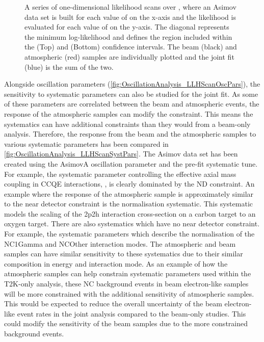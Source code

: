 \begin{figure}[h]
\begin{subfigure}[t]{1.0\textwidth}
  \end{subfigure}
  \caption{A series of one-dimensional likelihood scans over , where an Asimov data set is built for each value of  on the x-axis and the likelihood is evaluated for each value of  on the y-axis. The diagonal represents the minimum log-likelihood and defines the region included within the \quickmath{1\sigma} (Top) and \quickmath{2\sigma} (Bottom) confidence intervals. The beam (black) and atmospheric (red) samples are individually plotted and the joint fit (blue) is the sum of the two.}
  \label{fig:OscillationAnalysis_AsimovEval_TH23}
\end{figure}

\clearpage

Alongside oscillation parameters (\autoref{fig:OscillationAnalysis_LLHScanOscPars}), the sensitivity to systematic parameters can also be studied for the joint fit. As some of these parameters are correlated between the beam and atmospheric events, the response of the atmospheric samples can modify the constraint. This means the systematics can have additional constraints than they would from a beam-only analysis. Therefore, the response from the beam and the atmospheric samples to various systematic parameters has been compared in \autoref{fig:OscillationAnalysis_LLHScanSystPars}. The Asimov data set has been created using the AsimovA oscillation parameter and the pre-fit systematic tune. For example, the systematic parameter controlling the effective axial mass coupling in CCQE interactions, , is clearly dominated by the ND constraint. An example where the response of the atmospheric sample is approximately similar to the near detector constraint is the  normalisation systematic. This systematic models the scaling of the 2p2h interaction cross-section on a carbon target to an oxygen target. There are also systematics which have no near detector constraint. For example, the systematic parameters which describe the normalisation of the NC1Gamma and NCOther interaction modes. The atmospheric and beam samples can have similar sensitivity to these systematics due to their similar composition in energy and interaction mode. As an example of how the atmospheric samples can help constrain systematic parameters used within the T2K-only analysis, these NC background events in beam electron-like samples will be more constrained with the additional sensitivity of atmospheric samples. This would be expected to reduce the overall uncertainty of the beam electron-like event rates in the joint analysis compared to the beam-only studies. This could modify the sensitivity of the beam samples due to the more constrained background events.

